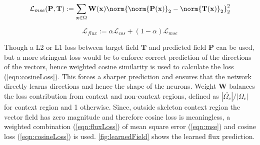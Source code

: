 \begin{equation} \label{eqn:mse}
\mathcal{L}_{mse}(\mathbf{P}, \mathbf{T}) := \sum_{\mathbf{x} \in \Omega} \mathbf{W}(\mathbf{x}) \norm{ \norm{\mathbf{P}(\mathbf{x})}_{2} - \norm{\mathbf{T}(\mathbf{x})}_{2}}_2^2
\end{equation}

\begin{equation} \label{eqn:fluxLoss}
\mathcal{L}_{flux} := \alpha\mathcal{L}_{cos} + (1-\alpha)\mathcal{L}_{mse}
\end{equation}

Though a L2 or L1 loss between target field $\mathbf{T}$ and predicted field $\mathbf{P}$ can be used, but a more stringent loss would be to enforce correct prediction of the directions of the vectors, hence weighted cosine similarity is used to calculate the loss (\autoref{eqn:cosineLoss}). This forces a sharper prediction and ensures that the network directly learns directions and hence the shape of the neurons. Weight $\mathbf{W}$ balances the loss contribution from context and non-context regions, defined as $|\overline{\Omega_{c}}|/|\Omega_{c}|$ for context region and 1 otherwise. Since, outside skeleton context region the vector field has zero magnitude and therefore cosine loss is meaningless, a weighted combination (\autoref{eqn:fluxLoss}) of mean square error (\autoref{eqn:mse}) and cosine loss (\autoref{eqn:cosineLoss}) is used. \autoref{fig:learnedField} shows the learned flux prediction.

